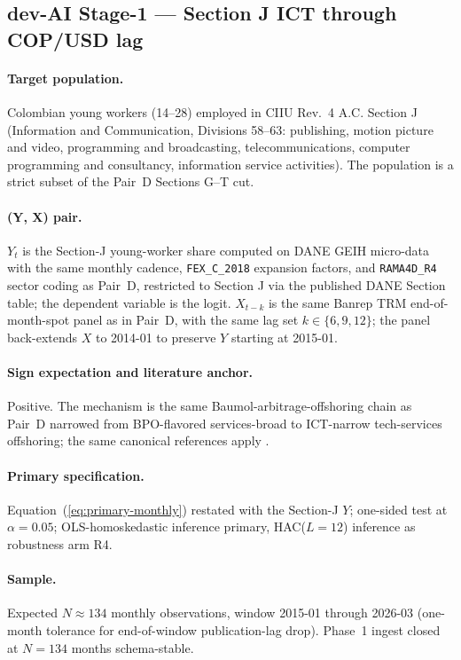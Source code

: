 \subsection{dev-AI Stage-1 --- Section J ICT through COP/USD lag}\label{sec:6.2}

\paragraph{Target population.} Colombian young workers (14--28) employed
in CIIU Rev.~4 A.C. Section J (Information and Communication, Divisions
58--63: publishing, motion picture and video, programming and
broadcasting, telecommunications, computer programming and consultancy,
information service activities). The population is a strict subset of
the Pair~D Sections G--T cut.

\paragraph{(Y, X) pair.} \(Y_t\) is the Section-J young-worker share
computed on DANE GEIH micro-data with the same monthly cadence,
\texttt{FEX\_C\_2018} expansion factors, and \texttt{RAMA4D\_R4}
sector coding as Pair~D, restricted to Section J via the published
DANE Section table; the dependent variable is the logit. \(X_{t-k}\)
is the same Banrep TRM end-of-month-spot panel as in Pair~D, with the
same lag set \(k \in \{6, 9, 12\}\); the panel back-extends \(X\) to
2014-01 to preserve \(Y\) starting at 2015-01.

\paragraph{Sign expectation and literature anchor.} Positive. The
mechanism is the same Baumol-arbitrage-offshoring chain as Pair~D
narrowed from BPO-flavored services-broad to ICT-narrow
tech-services offshoring; the same canonical references apply
\citep{mendietamunoz2017, beerepoothendriks2013, errighibodwell2017,
rodrik2016}.

\paragraph{Primary specification.} Equation~(\ref{eq:primary-monthly})
restated with the Section-J \(Y\); one-sided test at \(\alpha = 0.05\);
OLS-homoskedastic inference primary, HAC(\(L = 12\)) inference as
robustness arm R4.

\paragraph{Sample.} Expected \(N \approx 134\) monthly observations,
window 2015-01 through 2026-03 (one-month tolerance for end-of-window
publication-lag drop). Phase~1 ingest closed at \(N = 134\) months
schema-stable.

